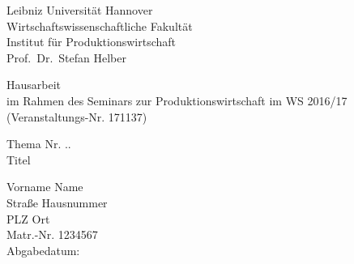\documentclass[a4paper,12pt,parskip,bibtotoc,liststotoc]{article}
\begin{document}
%
%
\thispagestyle{empty}  %
Leibniz Universität Hannover\\
Wirtschaftswissenschaftliche Fakultät\\
Institut für Produktionswirtschaft\\
Prof.\ Dr.\ Stefan Helber

\vspace{5cm}

\begin{center}
Hausarbeit \\
im Rahmen des Seminars zur Produktionswirtschaft im WS 2016/17 \\
(Veranstaltungs-Nr. 171137)

\vspace{2.5cm}

Thema Nr. ..\\[1mm]    %
{\Large Titel }
\end{center}

\vspace{7.5cm}

Vorname Name \\
Straße Hausnummer \\
PLZ Ort \\
Matr.-Nr. 1234567 \\[3mm]
Abgabedatum:


\newpage

\tableofcontents

\newpage  %

\listoffigures

\listoftables

\end{document}
